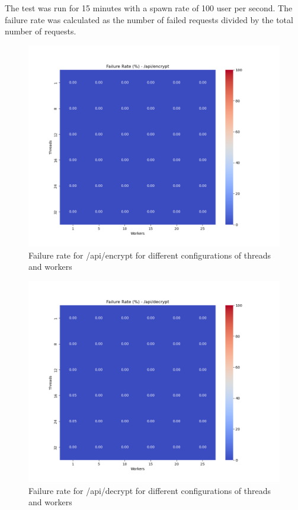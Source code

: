 \documentclass[cic,tc,english]{iiufrgs}
\begin{document}
            The test was run for 15 minutes with a spawn rate of 100 user per second. The failure rate was calculated as the number of failed requests divided by the total number of requests.

            \begin{figure}[h]
                \centering
                \includegraphics[width=\textwidth]{images/phase1/failure_rate__api_encrypt.png}
                \caption{Failure rate for /api/encrypt for different configurations of threads and workers}
                \label{fig:failurerateencrypt}
            \end{figure}

            \begin{figure}[h]
                \centering
                \includegraphics[width=\textwidth]{images/phase1/failure_rate__api_decrypt.png}
                \caption{Failure rate for /api/decrypt for different configurations of threads and workers}
                \label{fig:failureratedecrypt}
            \end{figure}
\end{document}
